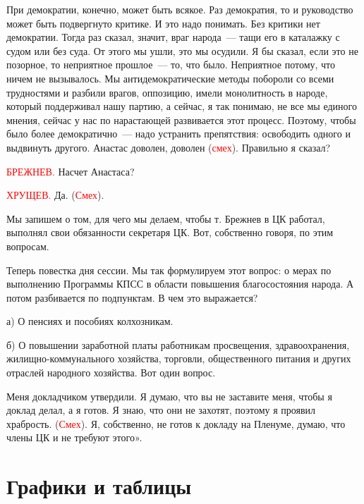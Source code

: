 \documentclass{kursa4}
\begin{document}
      {При демократии, конечно, может быть всякое. Раз демократия, то и руководство может быть подвергнуто критике. И это надо понимать. Без критики нет демократии. Тогда раз сказал, значит, враг народа~--- тащи его в каталажку с судом или без суда. От этого мы ушли, это мы осудили. Я бы сказал, если это не позорное, то неприятное прошлое~--- то, что было. Неприятное потому, что ничем не вызывалось. Мы антидемократические методы побороли со всеми трудностями и разбили врагов, оппозицию, имели монолитность в народе, который поддерживал нашу партию, а сейчас, я так понимаю, не все мы единого мнения, сейчас у нас по нарастающей развивается этот процесс. Поэтому, чтобы было более демократично~--- надо устранить препятствия: освободить одного и выдвинуть другого. Анастас доволен, доволен (}\textcolor{red}{смех}{). Правильно я сказал?}

      \textcolor{red}{БРЕЖНЕВ.}{
      Насчет Анастаса?}

      \textcolor{red}{ХРУЩЕВ.}{
      Да. (}\textcolor{red}{Смех}{).}

      {Мы запишем о том, для чего мы делаем, чтобы т. Брежнев в ЦК работал, выполнял свои обязанности секретаря ЦК. Вот, собственно говоря, по этим вопросам.}

      {Теперь повестка дня сессии. Мы так формулируем этот вопрос: о мерах по выполнению Программы КПСС в области повышения благосостояния народа. А потом разбивается по подпунктам. В чем это выражается?}

      {а) О пенсиях и пособиях колхозникам.}

      {б) О повышении заработной платы работникам просвещения, здравоохранения, жилищно-коммунального хозяйства, торговли, общественного питания и других отраслей народного хозяйства. Вот один вопрос.}

      {Меня докладчиком утвердили. Я думаю, что вы не заставите меня, чтобы я доклад делал, а я готов. Я знаю, что они не захотят, поэтому я проявил храбрость. (}\textcolor{red}{Смех}{). Я, собственно, не готов к докладу на Пленуме, думаю, что члены ЦК и не требуют этого».}

    \section*{Графики и таблицы}
\end{document}
